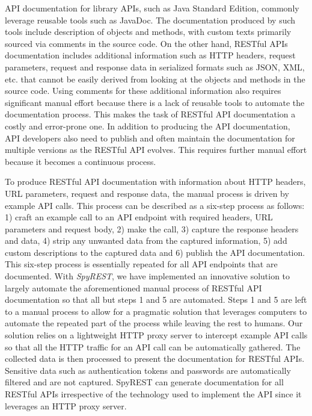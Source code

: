 \documentclass[conference]{IEEEtran}
\begin{document}
API documentation for library APIs, such as Java Standard Edition, commonly leverage reusable tools such as JavaDoc. The documentation produced by such tools include description of objects and methods, with custom texts primarily sourced via comments in the source code. On the other hand, RESTful APIs documentation includes additional information such as HTTP headers, request parameters, request and response data in serialized formats such as JSON, XML, etc. that cannot be easily derived from looking at the objects and methods in the source code. Using comments for these additional information also requires significant manual effort because there is a lack of reusable tools to automate the documentation process. This makes the task of RESTful API documentation a costly and error-prone one. In addition to producing the API documentation, API developers also need to publish and often maintain the documentation for multiple versions as the RESTful API evolves. This requires further manual effort because it becomes a continuous process.

To produce RESTful API documentation with information about HTTP headers, URL parameters, request and response data, the manual process is driven by example API calls. This process can be described as a six-step process as follows: 1) craft an example call to an API endpoint with required headers, URL parameters and request body, 2) make the call, 3) capture the response headers and data, 4) strip any unwanted data from the captured information, 5) add custom descriptions to the captured data and 6) publish the API documentation. This six-step process is essentially repeated for all API endpoints that are documented. With \emph{SpyREST}, we have implemented an innovative solution to largely automate the aforementioned manual process of RESTful API documentation so that all but steps 1 and 5 are automated. Steps 1 and 5 are left to a manual process to allow for a pragmatic solution that leverages computers to automate the repeated part of the process while leaving the rest to humans. Our solution relies on a lightweight HTTP proxy server to intercept example API calls so that all the HTTP traffic for an API call can be automatically gathered. The collected data is then processed to present the documentation for RESTful APIs. Sensitive data such as authentication tokens and passwords are automatically filtered and are not captured. SpyREST can generate documentation for all RESTful APIs irrespective of the technology used to implement the API since it leverages an HTTP proxy server.
\end{document}
